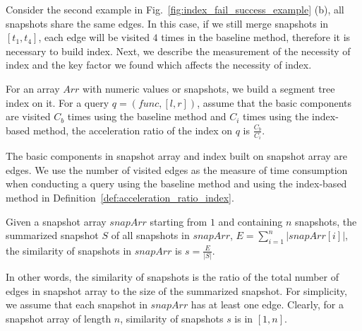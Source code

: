 \documentclass[10pt,journal,compsoc]{IEEEtran}
\begin{document}
Consider the second example in Fig.~\ref{fig:index_fail_success_example} (b), all snapshots share the same edges. In this case, if we still merge snapshots in $ [t_1,t_4] $, each edge will be visited $ 4 $ times in the baseline method, therefore it is necessary to build index. Next, we describe the measurement of the necessity of index and the key factor we found which affects the necessity of index.
\begin{definition}
	\label{def:acceleration_ratio_index}
	For an array $ Arr $ with numeric values or snapshots, we build a segment tree index on it. For a query $ q=(func,[l,r]) $, assume that the basic components are visited $ C_b $ times using the baseline method and $ C_i $ times using the index-based method, the acceleration ratio of the index on $ q $ is $ \frac{C_b}{C_i} $.
\end{definition}
The basic components in snapshot array and index built on snapshot array are edges. We use the number of visited edges as the measure of time consumption when conducting a query using the baseline method and using the index-based method in Definition~\ref{def:acceleration_ratio_index}.
\begin{definition}
	\label{def:similarity_snapshots}
	Given a snapshot array $ snapArr $ starting from $ 1 $ and containing $ n $ snapshots, the summarized snapshot $ S $ of all snapshots in $ snapArr $, $ E=\sum_{i=1}^{n}|snapArr[i]| $, the similarity of snapshots in $ snapArr $ is $ s=\frac{E}{|S|} $.
\end{definition}
In other words, the similarity of snapshots is the ratio of the total number of edges in snapshot array to the size of the summarized snapshot. For simplicity, we assume that each snapshot in $ snapArr $ has at least one edge. Clearly, for a snapshot array of length $ n $, similarity of snapshots $ s $ is in $ [1,n] $.
\end{document}
